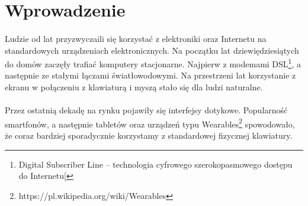 \section{Wprowadzenie}
\paragraph{}
Ludzie od lat przyzwyczaili się korzystać z elektroniki oraz Internetu na standardowych urządzeniach elektronicznych. Na początku lat dziewiędziesiątych do domów zaczęły trafiać komputery stacjonarne. Najpierw z modemami DSL\footnote{Digital Subscriber Line – technologia cyfrowego szerokopasmowego dostępu do Internetu[}, a następnie ze stałymi łączami światłowodowymi. Na przestrzeni lat korzystanie z ekranu w połączeniu z klawiaturą i myszą stało się dla ludzi naturalne.
\paragraph{}
Przez ostatnią dekadę na rynku pojawiły się interfejsy dotykowe. Popularność smartfonów, a następnie tabletów oraz urządzeń typu Wearables\footnote{https://pl.wikipedia.org/wiki/Wearables} spowodowało, że coraz bardziej sporadycznie korzystamy z standardowej fizycznej klawiatury.
